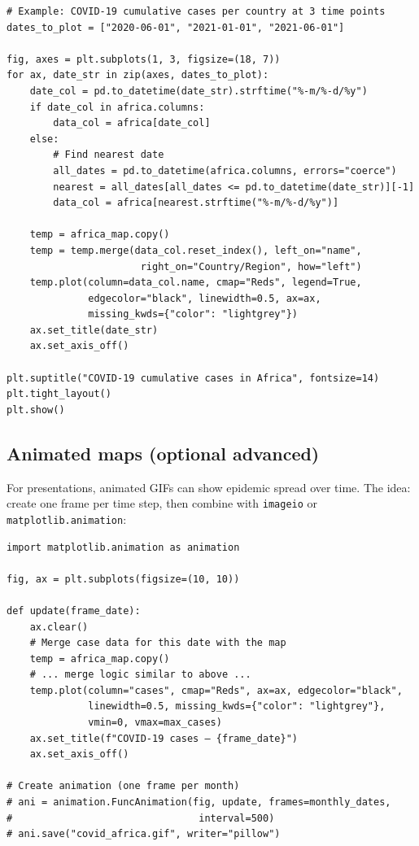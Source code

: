 \begin{verbatim}
# Example: COVID-19 cumulative cases per country at 3 time points
dates_to_plot = ["2020-06-01", "2021-01-01", "2021-06-01"]

fig, axes = plt.subplots(1, 3, figsize=(18, 7))
for ax, date_str in zip(axes, dates_to_plot):
    date_col = pd.to_datetime(date_str).strftime("%-m/%-d/%y")
    if date_col in africa.columns:
        data_col = africa[date_col]
    else:
        # Find nearest date
        all_dates = pd.to_datetime(africa.columns, errors="coerce")
        nearest = all_dates[all_dates <= pd.to_datetime(date_str)][-1]
        data_col = africa[nearest.strftime("%-m/%-d/%y")]

    temp = africa_map.copy()
    temp = temp.merge(data_col.reset_index(), left_on="name",
                       right_on="Country/Region", how="left")
    temp.plot(column=data_col.name, cmap="Reds", legend=True,
              edgecolor="black", linewidth=0.5, ax=ax,
              missing_kwds={"color": "lightgrey"})
    ax.set_title(date_str)
    ax.set_axis_off()

plt.suptitle("COVID-19 cumulative cases in Africa", fontsize=14)
plt.tight_layout()
plt.show()
\end{verbatim}

\subsection{Animated maps (optional advanced)}

For presentations, animated GIFs can show epidemic spread over time. The idea: create one frame per time step, then combine with \texttt{imageio} or \texttt{matplotlib.animation}:

\begin{verbatim}
import matplotlib.animation as animation

fig, ax = plt.subplots(figsize=(10, 10))

def update(frame_date):
    ax.clear()
    # Merge case data for this date with the map
    temp = africa_map.copy()
    # ... merge logic similar to above ...
    temp.plot(column="cases", cmap="Reds", ax=ax, edgecolor="black",
              linewidth=0.5, missing_kwds={"color": "lightgrey"},
              vmin=0, vmax=max_cases)
    ax.set_title(f"COVID-19 cases — {frame_date}")
    ax.set_axis_off()

# Create animation (one frame per month)
# ani = animation.FuncAnimation(fig, update, frames=monthly_dates,
#                                interval=500)
# ani.save("covid_africa.gif", writer="pillow")
\end{verbatim}

